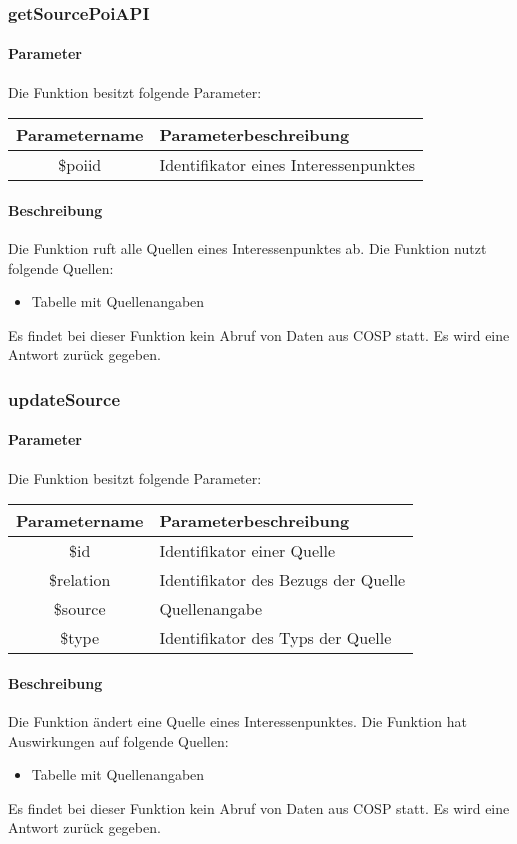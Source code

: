 \subsubsection{getSourcePoiAPI}
\paragraph{Parameter} Die Funktion besitzt folgende Parameter:
\begin{table}[H]
	\begin{tabular}{|c|p{11cm}|}
		\hline
		\textbf{Parametername} & \textbf{Parameterbeschreibung} \\ \hline
		\$poiid    & Identifikator eines Interessenpunktes \\ \hline
	\end{tabular}
\end{table}
\paragraph{Beschreibung} Die Funktion ruft alle Quellen eines Interessenpunktes ab. Die Funktion nutzt folgende Quellen:
\begin{itemize}
	\item Tabelle mit Quellenangaben
\end{itemize}
Es findet bei dieser Funktion kein Abruf von Daten aus {\glqq COSP\grqq} statt. Es wird eine Antwort zurück gegeben.
\subsubsection{updateSource}
\paragraph{Parameter} Die Funktion besitzt folgende Parameter:
\begin{table}[H]
	\begin{tabular}{|c|p{11cm}|}
		\hline
		\textbf{Parametername} & \textbf{Parameterbeschreibung} \\ \hline
		\$id       & Identifikator einer Quelle \\ \hline
		\$relation & Identifikator des Bezugs der Quelle \\ \hline
		\$source   & Quellenangabe \\ \hline
		\$type     & Identifikator des Typs der Quelle \\ \hline
	\end{tabular}
\end{table}
\paragraph{Beschreibung} Die Funktion ändert eine Quelle eines Interessenpunktes. Die Funktion hat Auswirkungen auf folgende Quellen:
\begin{itemize}
	\item Tabelle mit Quellenangaben
\end{itemize}
Es findet bei dieser Funktion kein Abruf von Daten aus {\glqq COSP\grqq} statt. Es wird eine Antwort zurück gegeben.
